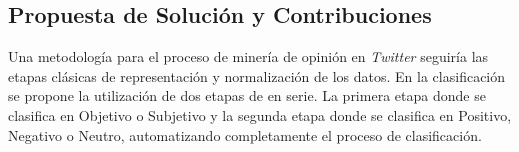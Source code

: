 \begin{introduction}
\section*{Propuesta de Solución y Contribuciones}
% 
% 
% 
% 
% 
% 

Una metodología para el proceso de minería de opinión en \emph{Twitter} 
seguiría las etapas clásicas de representación y normalización de 
los datos. En la clasificación se propone la utilización de dos etapas de
en serie. La primera etapa donde se clasifica
en Objetivo o Subjetivo y la segunda etapa donde se
clasifica en Positivo, Negativo o Neutro, automatizando completamente 
el proceso de clasificación.


\end{introduction}

